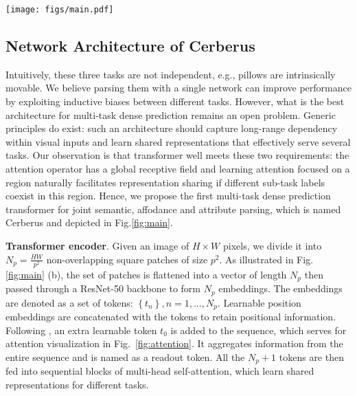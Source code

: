 \documentclass[10pt,twocolumn,letterpaper]{article}
\begin{document}
\begin{figure*}[t]
  \centering
  \texttt{[image: figs/main.pdf]}
  \caption{\textbf{Overall network architecture of Cerberus.} Given an image, ResNet-50 extract features from the input image to form a set of tokens. The tokens are processed by a transformer encoder and decoded by reassemble operations and fusion blocks. Through three prediction heads, the feature maps are turned into final attribute, affordance and semantic parsing results.}
  \label{fig:main} 
\end{figure*}

\subsection{Network Architecture of Cerberus}
Intuitively, these three tasks are not independent, e.g., pillows are intrinsically movable. We believe parsing them with a single network can improve performance by exploiting inductive biases between different tasks. However, what is the best architecture for multi-task dense prediction remains an open problem. Generic principles do exist: such an architecture should capture long-range dependency within visual inputs and learn shared representations that effectively serve several tasks. Our observation is that transformer well meets these two requirements: the attention operator has a global receptive field and learning attention focused on a region naturally facilitates representation sharing if different sub-task labels coexist in this region. Hence, we propose the first multi-task dense prediction transformer for joint semantic, affodance and attribute parsing, which is named Cerberus and depicted in Fig.\ref{fig:main}. 

\textbf{Transformer encoder}. Given an image of $H \times W$ pixels, we divide it into $N_p = \frac{HW}{p^2}$ non-overlapping square patches of size $p^2$. As illustrated in Fig.\ref{fig:main} (b), the set of patches is flattened into a vector of length $N_p$ then passed through a ResNet-50 backbone to form $N_p$ embeddings. The embeddings are denoted as a set of tokens: $\left\{t_n\right\}, n=1,...,N_p$. Learnable position embeddings are concatenated with the tokens to retain positional information. Following \cite{ranftl2021vision}, an extra learnable token $t_0$ is added to the sequence, which serves for attention visualization in Fig.~\ref{fig:attention}. It aggregates information from the entire sequence and is named as a readout token. All the  $N_p+1$ tokens are then fed into sequential blocks of multi-head self-attention, which learn shared representations for different tasks.
\end{document}
